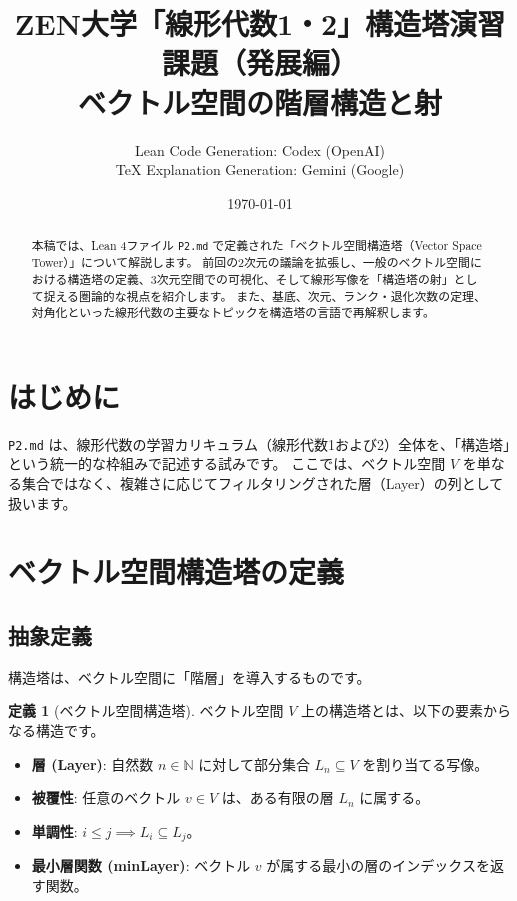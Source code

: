 \documentclass[judge=standard,11pt]{jlreq}
\title{ZEN大学「線形代数1・2」構造塔演習課題（発展編）\\ ベクトル空間の階層構造と射}
\author{Lean Code Generation: Codex (OpenAI) \\ TeX Explanation Generation: Gemini (Google)}
\date{\today}
\theoremstyle{definition}
\newtheorem{definition}{定義}[section]
\begin{document}
\maketitle

\begin{abstract}
本稿では、Lean 4ファイル \texttt{P2.md} で定義された「ベクトル空間構造塔（Vector Space Tower）」について解説します。
前回の2次元の議論を拡張し、一般のベクトル空間における構造塔の定義、3次元空間での可視化、そして線形写像を「構造塔の射」として捉える圏論的な視点を紹介します。
また、基底、次元、ランク・退化次数の定理、対角化といった線形代数の主要なトピックを構造塔の言語で再解釈します。
\end{abstract}

\tableofcontents

\section{はじめに}
\texttt{P2.md} は、線形代数の学習カリキュラム（線形代数1および2）全体を、「構造塔」という統一的な枠組みで記述する試みです。
ここでは、ベクトル空間 $V$ を単なる集合ではなく、複雑さに応じてフィルタリングされた層（Layer）の列として扱います。

\section{ベクトル空間構造塔の定義}

\subsection{抽象定義}
構造塔は、ベクトル空間に「階層」を導入するものです。

\begin{definition}[ベクトル空間構造塔]
ベクトル空間 $V$ 上の構造塔とは、以下の要素からなる構造です。
\begin{itemize}
    \item \textbf{層 (Layer)}: 自然数 $n \in \mathbb{N}$ に対して部分集合 $L_n \subseteq V$ を割り当てる写像。
    \item \textbf{被覆性}: 任意のベクトル $v \in V$ は、ある有限の層 $L_n$ に属する。
    \item \textbf{単調性}: $i \le j \implies L_i \subseteq L_j$。
    \item \textbf{最小層関数 (minLayer)}: ベクトル $v$ が属する最小の層のインデックスを返す関数。
\end{itemize}
\end{definition}
\end{document}
